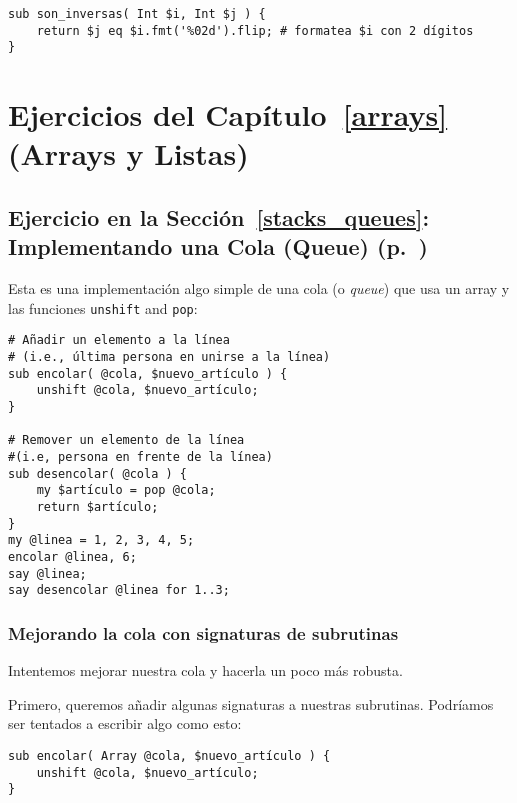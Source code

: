 \begin{verbatim}
sub son_inversas( Int $i, Int $j ) {
    return $j eq $i.fmt('%02d').flip; # formatea $i con 2 dígitos
}
\end{verbatim}


\section{Ejercicios del Capítulo~\ref{arrays} (Arrays y Listas)}

\subsection{Ejercicio en la Sección~\ref{stacks_queues}: Implementando una Cola (Queue) (p.~\pageref{exercise_queue})}
\label{sol_exercise_queue}

Esta es una implementación algo simple de una cola (o \emph{queue})
que usa un array y las funciones {\tt unshift} and {\tt pop}:

\begin{verbatim}
# Añadir un elemento a la línea 
# (i.e., última persona en unirse a la línea)
sub encolar( @cola, $nuevo_artículo ) {
    unshift @cola, $nuevo_artículo;
}

# Remover un elemento de la línea 
#(i.e, persona en frente de la línea)
sub desencolar( @cola ) {
    my $artículo = pop @cola;
    return $artículo;
}
my @linea = 1, 2, 3, 4, 5;
encolar @linea, 6;
say @linea;
say desencolar @linea for 1..3;
\end{verbatim}

\subsubsection{Mejorando la cola con signaturas de subrutinas}

Intentemos mejorar nuestra cola y hacerla un poco más robusta.

Primero, queremos añadir algunas signaturas a nuestras subrutinas. 
Podríamos ser tentados a escribir algo como esto:

\begin{verbatim}
sub encolar( Array @cola, $nuevo_artículo ) {
	unshift @cola, $nuevo_artículo;
}
\end{verbatim}

